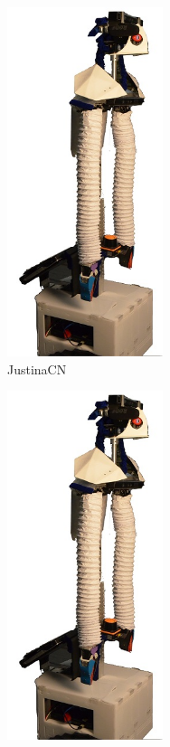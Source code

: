 \documentclass[letterpaper,12pt]{article}
\begin{document}
\begin{figure}
\centering
\begin{subfigure}{0.45\textwidth}
  \centering
  \includegraphics[width=0.5\textwidth]{Figures/JustinaCN.jpg}
  \caption{JustinaCN}
  \label{fig:JustinaCN}
\end{subfigure}
\begin{subfigure}{0.45\textwidth}
  \centering
  \includegraphics[width=0.5\textwidth]{Figures/JustinaNL.jpg}

\end{subfigure}
\end{figure}
\end{document}
